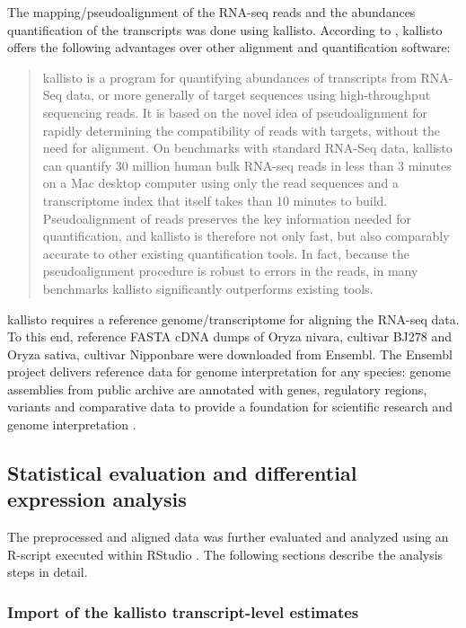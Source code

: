 The mapping/pseudoalignment of the RNA-seq reads and the abundances quantification of the transcripts was done using kallisto. According to \autocite{10.1038/nbt.3519}, kallisto offers the following advantages over other alignment and quantification software:
\begin{quote}
    kallisto is a program for quantifying abundances of transcripts from RNA-Seq data, or more generally of target sequences using high-throughput sequencing reads. It is based on the novel idea of pseudoalignment for rapidly determining the compatibility of reads with targets, without the need for alignment. On benchmarks with standard RNA-Seq data, kallisto can quantify 30 million human bulk RNA-seq reads in less than 3 minutes on a Mac desktop computer using only the read sequences and a transcriptome index that itself takes than 10 minutes to build. Pseudoalignment of reads preserves the key information needed for quantification, and kallisto is therefore not only fast, but also comparably accurate to other existing quantification tools. In fact, because the pseudoalignment procedure is robust to errors in the reads, in many benchmarks kallisto significantly outperforms existing tools.
\end{quote}

kallisto requires a reference genome/transcriptome for aligning the RNA-seq data. To this end, reference FASTA cDNA dumps of Oryza nivara, cultivar BJ278 and Oryza sativa, cultivar Nipponbare were downloaded from Ensembl. The Ensembl project delivers reference data for genome interpretation for any species: genome assemblies from public archive are annotated with genes, regulatory regions, variants and comparative data to provide a foundation for scientific research and genome interpretation \autocite{10.1093/bioinformatics/btu170}.


\subsection{Statistical evaluation and differential expression analysis}

The preprocessed and aligned data was further evaluated and analyzed using an R-script \autocite{R-base} executed within RStudio \autocite{RStudio}. The following sections describe the analysis steps in detail.

\subsubsection{Import of the kallisto transcript-level estimates}

